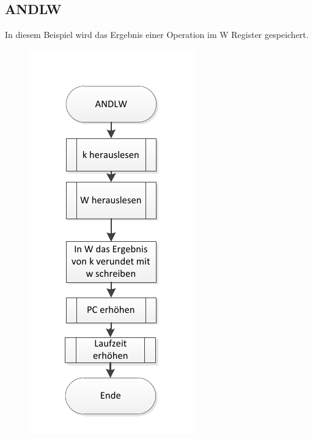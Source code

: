 \newpage
\subsection{ANDLW}

In diesem Beispiel wird das Ergebnis einer Operation im W Register gespeichert.

\begin{figure}[h]
\centering
\includegraphics[scale=0.7]{Diag/ANDLW.pdf}
\end{figure}
